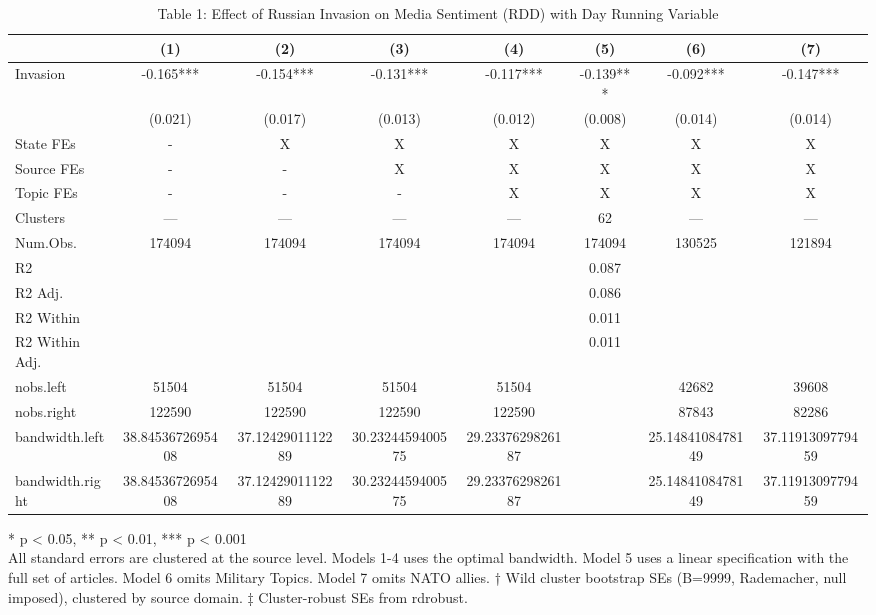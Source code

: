 \begin{table}[!t]
\caption{Table 1: Effect of Russian Invasion on Media Sentiment (RDD) with Day Running Variable} 
\fontsize{12.0pt}{14.4pt}\selectfont
\begin{tabular*}{\linewidth}{@{\extracolsep{\fill}}lccccccc}
\toprule
  & (1) & (2) & (3) & (4) & (5) & (6) & (7) \\ 
\midrule\addlinespace[2.5pt]
Invasion & -0.165*** & -0.154*** & -0.131*** & -0.117*** & -0.139*** & -0.092*** & -0.147*** \\ 
{} & {(0.021)} & {(0.017)} & {(0.013)} & {(0.012)} & {(0.008)} & {(0.014)} & {(0.014)} \\ 
State FEs & - & X & X & X & X & X & X \\ 
Source FEs & - & - & X & X & X & X & X \\ 
Topic FEs & - & - & - & X & X & X & X \\ 
Clusters & — & — & — & — & 62 & — & — \\ 
Num.Obs. & 174094 & 174094 & 174094 & 174094 & 174094 & 130525 & 121894 \\ 
R2 &  &  &  &  & 0.087 &  &  \\ 
R2 Adj. &  &  &  &  & 0.086 &  &  \\ 
R2 Within &  &  &  &  & 0.011 &  &  \\ 
R2 Within Adj. &  &  &  &  & 0.011 &  &  \\ 
nobs.left & 51504 & 51504 & 51504 & 51504 &  & 42682 & 39608 \\ 
nobs.right & 122590 & 122590 & 122590 & 122590 &  & 87843 & 82286 \\ 
bandwidth.left & 38.8453672695408 & 37.1242901112289 & 30.2324459400575 & 29.2337629826187 &  & 25.1484108478149 & 37.1191309779459 \\ 
bandwidth.right & 38.8453672695408 & 37.1242901112289 & 30.2324459400575 & 29.2337629826187 &  & 25.1484108478149 & 37.1191309779459 \\ 
\bottomrule
\end{tabular*}
\begin{minipage}{\linewidth}
* p < 0.05, ** p < 0.01, *** p < 0.001\\
All standard errors are clustered at the source level. Models 1-4 uses the
optimal bandwidth. Model 5 uses a linear specification with the full set of
articles. Model 6 omits Military Topics. Model 7 omits NATO allies. † Wild
cluster bootstrap SEs (B=9999, Rademacher, null imposed), clustered by source
domain. ‡ Cluster-robust SEs from rdrobust.\\
\end{minipage}
\end{table}

